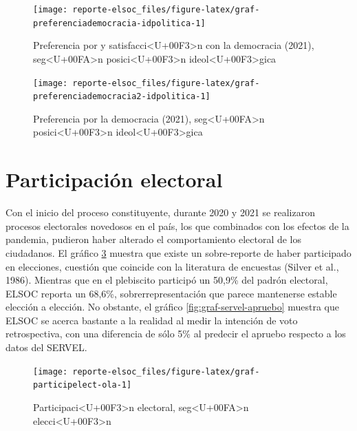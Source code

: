 \documentclass[
  12pt,
]{book}
\begin{document}
\begin{figure}

{\centering \texttt{[image: reporte-elsoc\_files/figure-latex/graf-preferenciademocracia-idpolitica-1]} 

}

\caption{Preferencia por y satisfacci<U+00F3>n con la democracia (2021), seg<U+00FA>n posici<U+00F3>n ideol<U+00F3>gica}\label{fig:graf-preferenciademocracia-idpolitica}
\end{figure}

\begin{figure}

{\centering \texttt{[image: reporte-elsoc\_files/figure-latex/graf-preferenciademocracia2-idpolitica-1]} 

}

\caption{Preferencia por la democracia (2021), seg<U+00FA>n posici<U+00F3>n ideol<U+00F3>gica}\label{fig:graf-preferenciademocracia2-idpolitica}
\end{figure}

\hypertarget{participaciuxf3n-electoral}{%
\section{Participación electoral}\label{participaciuxf3n-electoral}}

Con el inicio del proceso constituyente, durante 2020 y 2021 se realizaron procesos electorales novedosos en el país, los que combinados con los efectos de la pandemia, pudieron haber alterado el comportamiento electoral de los ciudadanos. El gráfico \ref{fig:graf-participelect-ola} muestra que existe un sobre-reporte de haber participado en elecciones, cuestión que coincide con la literatura de encuestas (Silver et al., 1986). Mientras que en el plebiscito participó un 50,9\% del padrón electoral, ELSOC reporta un 68,6\%, sobrerrepresentación que parece mantenerse estable elección a elección. No obstante, el gráfico \ref{fig:graf-servel-apruebo} muestra que ELSOC se acerca bastante a la realidad al medir la intención de voto retrospectiva, con una diferencia de sólo 5\% al predecir el apruebo respecto a los datos del SERVEL.

\begin{figure}

{\centering \texttt{[image: reporte-elsoc\_files/figure-latex/graf-participelect-ola-1]} 

}

\caption{Participaci<U+00F3>n electoral, seg<U+00FA>n elecci<U+00F3>n}\label{fig:graf-participelect-ola}
\end{figure}
\end{document}
